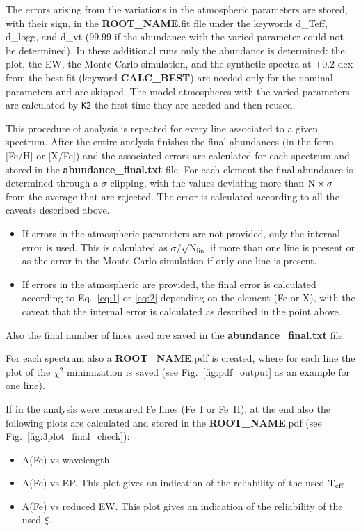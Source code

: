 \documentclass[modern]{aastex701}
\begin{document}
The errors arising from the variations in the atmospheric parameters are stored, with their sign, in the {\bf ROOT\_NAME}.fit file under the keywords d\_Teff, d\_logg, and d\_vt (99.99 if the abundance with the varied parameter could not be determined). In these additional runs only the abundance is determined: the plot, the EW, the Monte Carlo simulation, and the synthetic spectra at $\pm 0.2$ dex from the best fit (keyword {\bf CALC\_BEST}) are needed only for the nominal parameters and are skipped. The model atmospheres with the varied parameters are calculated by \texttt{K2} the first time they are needed and then reused. 

This procedure of analysis is repeated for every line associated to a given spectrum. After the entire analysis finishes the final abundances (in the form [Fe/H] or [X/Fe]) and the associated errors are calculated for each spectrum and stored in the {\bf abundance\_final.txt} file. For each element the final abundance is determined through a $\sigma$-clipping, with the values deviating more than $\rm N\times\sigma$ from the average that are rejected. The error is calculated according to all the caveats described above. 
\begin{itemize}
    \item If errors in the atmospheric parameters are not provided, only the internal error is used. This is calculated as  $\sigma / \sqrt{\mathrm{N_{lin}}}$ if more than one line is present or as the error in the Monte Carlo simulation if only one line is present.
    \item If errors in the atmospheric are provided, the final error is calculated according to Eq.~\ref{eq:1} or \ref{eq:2} depending on the element (Fe or X), with the caveat that the internal error is calculated as described in the point above. 
\end{itemize}

Also the final number of lines used are saved in the {\bf abundance\_final.txt} file. 

For each spectrum also a {\bf ROOT\_NAME}.pdf is created, where for each line the plot of the $\chi^2$ minimization is saved (see Fig.~\ref{fig:pdf_output} as an example for one line). 

If in the analysis were measured Fe lines (Fe~I or Fe~II), at the end also the following plots are calculated and stored in the {\bf ROOT\_NAME}.pdf (see Fig.~\ref{fig:3plot_final_check}): 
\begin{itemize}
    \item A(Fe) vs wavelength
    \item A(Fe) vs EP. This plot gives an indication of the reliability of the used $\rm T_{eff}$. 
    \item A(Fe) vs reduced EW. This plot gives an indication of the reliability of the used $\xi$. 
\end{itemize}
\end{document}
